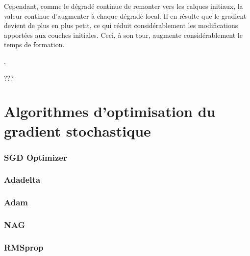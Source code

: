 	Cependant, comme le dégradé continue de remonter vers les calques initiaux, la valeur continue d'augmenter à chaque dégradé local. Il en résulte que le gradient devient de plus en plus petit, ce qui réduit considérablement les modifications apportées aux couches initiales. Ceci, à son tour, augmente considérablement le temps de formation.
	
	
	\cite{bottou2018optimization, antoine2018apprentissage}.
	
	???
	
	
	\section{Algorithmes d'optimisation du gradient stochastique} \label{sec:sgd_optimizers}
	\cite{burges2006learning} 
	\cite{ruder2016overview}
	\cite{lydia2019adagrad}
	\cite{}
	
	\lipsum[1]
	\subsubsection{SGD Optimizer}
	\lipsum[5]
	\subsubsection{Adadelta}
	\lipsum[2]
	
	
	
	\subsubsection{Adam}
	
	\cite{kingma2014adam}
	
	
	\lipsum[2]
	\subsubsection{NAG}
	\lipsum[4]
	\subsubsection{RMSprop}
	\lipsum[1]
	
